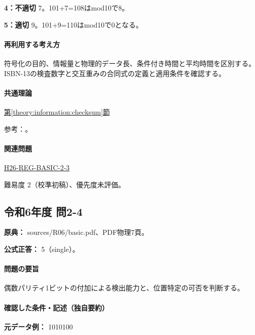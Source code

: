 \noindent\textbf{4：不適切} 7。101+7=\allowbreak{}108はmod10で8。\par

\noindent\textbf{5：適切} 9。101+9=\allowbreak{}110はmod10で0となる。\par

\paragraph{再利用する考え方} 符号化の目的、情報量と物理的データ長、条件付き時間と平均時間を区別する。ISBN-13の検査数字と交互重みの合同式の定義と適用条件を確認する。

\paragraph{共通理論} \hyperref[theory:information:checksum]{第\ref*{theory:information:checksum}節}

\par 参考：\cite{info_isbn}。

\paragraph{関連問題} \hyperref[q:h26-reg-basic-2-3]{H26-REG-BASIC-2-3}

\par 難易度 2（校準初稿）、優先度未評価。

\subsection{令和6年度 問2-4}
\label{q:r06-reg-basic-2-4}

\noindent\textbf{原典：} sources/R06/basic.pdf、PDF物理7頁。

\textbf{公式正答：} 5（single）。

\paragraph{問題の要旨} 偶数パリティ1ビットの付加による検出能力と、位置特定の可否を判断する。

\paragraph{確認した条件・記述（独自要約）}\mbox{}\par

\noindent\textbf{元データ例：} 1010100\par

